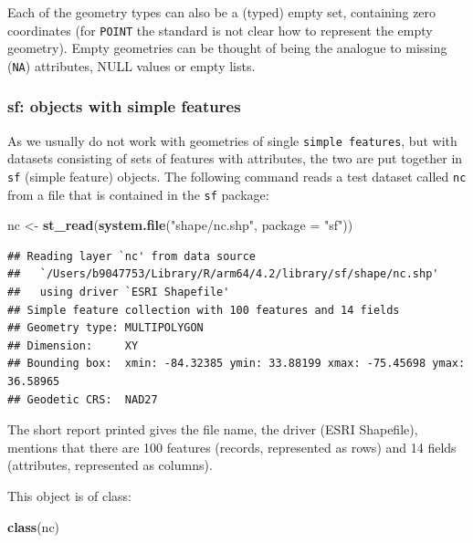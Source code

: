 \documentclass[
]{book}
\newenvironment{Shaded}{\begin{snugshade}}{\end{snugshade}}
\newcommand{\AttributeTok}[1]{\textcolor[rgb]{0.13,0.29,0.53}{#1}}
\newcommand{\FunctionTok}[1]{\textcolor[rgb]{0.13,0.29,0.53}{\textbf{#1}}}
\newcommand{\NormalTok}[1]{#1}
\newcommand{\OtherTok}[1]{\textcolor[rgb]{0.56,0.35,0.01}{#1}}
\newcommand{\StringTok}[1]{\textcolor[rgb]{0.31,0.60,0.02}{#1}}
\begin{document}
Each of the geometry types can also be a (typed) empty set, containing zero coordinates (for \texttt{POINT} the standard is not clear how to represent the empty geometry). Empty geometries can be thought of being the analogue to missing (\texttt{NA}) attributes, NULL values or empty lists.

\hypertarget{sf-objects-with-simple-features}{%
\subsubsection{sf: objects with simple features}\label{sf-objects-with-simple-features}}

As we usually do not work with geometries of single \texttt{simple\ features}, but with datasets consisting of sets of features with attributes, the two are put together in \texttt{sf} (simple feature) objects. The following command reads a test dataset called \texttt{nc} from a file that is contained in the \texttt{sf} package:

\begin{Shaded}
\begin{Highlighting}[]
\NormalTok{nc }\OtherTok{\textless{}{-}} \FunctionTok{st\_read}\NormalTok{(}\FunctionTok{system.file}\NormalTok{(}\StringTok{"shape/nc.shp"}\NormalTok{, }\AttributeTok{package =} \StringTok{"sf"}\NormalTok{))}
\end{Highlighting}
\end{Shaded}

\begin{verbatim}
## Reading layer `nc' from data source 
##   `/Users/b9047753/Library/R/arm64/4.2/library/sf/shape/nc.shp' 
##   using driver `ESRI Shapefile'
## Simple feature collection with 100 features and 14 fields
## Geometry type: MULTIPOLYGON
## Dimension:     XY
## Bounding box:  xmin: -84.32385 ymin: 33.88199 xmax: -75.45698 ymax: 36.58965
## Geodetic CRS:  NAD27
\end{verbatim}

The short report printed gives the file name, the driver (ESRI Shapefile), mentions that there are 100 features (records, represented as rows) and 14 fields (attributes, represented as columns).

This object is of class:

\begin{Shaded}
\begin{Highlighting}[]
\FunctionTok{class}\NormalTok{(nc)}
\end{Highlighting}
\end{Shaded}
\end{document}
